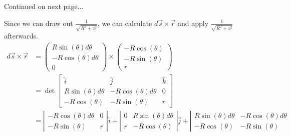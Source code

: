 \documentclass[12pt]{article}
\begin{document}
    \null\hfill Continued on next page...

    \pagebreak
    Since we can draw out $\frac{1}{\sqrt{R^2 + z^2}}$, we can calculate $d\vec{s} \times \vec{r}$ and apply $\frac{1}{\sqrt{R^2 + z^2}}$ afterwards.
    \begin{align}
        d\vec{s} \times \vec{r} &=  \begin{pmatrix}
                                        R\sin(\theta) d\theta\\
                                        -R\cos(\theta) d\theta\\
                                        0
                                    \end{pmatrix}
                                    \times
                                    \begin{pmatrix}
                                        -R\cos(\theta)\\
                                        -R\sin(\theta)\\
                                        r
                                    \end{pmatrix}\\
            &=  \det\begin{bmatrix}
                        \hat{i}                 &   \hat{j}                 &   \hat{k}\\
                        R\sin(\theta) d\theta   &   -R\cos(\theta) d\theta  &   0\\
                        -R\cos(\theta)          &   -R\sin(\theta)          &   r
                    \end{bmatrix}\\
            &=  \left| \begin{smallmatrix}
                    -R\cos(\theta) d\theta  &   0\\
                    -R\sin(\theta)          &   r
                \end{smallmatrix} \right|\hat{i} + 
                \left| \begin{smallmatrix}
                    0   &   R\sin(\theta) d\theta\\
                    r   &   -R\cos(\theta)
                \end{smallmatrix} \right|\hat{j} + 
                \left| \begin{smallmatrix}
                    R\sin(\theta) d\theta   &   -R\cos(\theta) d\theta\\
                    -R\cos(\theta)          &   -R\sin(\theta)

\end{smallmatrix}
\end{align}
\end{document}
